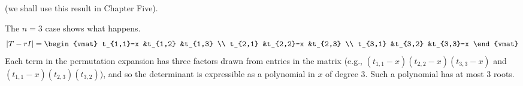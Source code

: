 \begin{exercises}
    (we shall use this result in Chapter Five).
    \begin{answer}
      The $n=3$ case shows what happens.
      \begin{equation*}
        \deter{T-rI}
        =
        \begin{vmat}
          t_{1,1}-x  &t_{1,2}   &t_{1,3}  \\ 
          t_{2,1}    &t_{2,2}-x &t_{2,3}  \\ 
          t_{3,1}    &t_{3,2}   &t_{3,3}-x  
        \end{vmat}
      \end{equation*}
      Each term in the permutation expansion has three factors drawn from 
      entries in the matrix (e.g., $(t_{1,1}-x)(t_{2,2}-x)(t_{3,3}-x)$
      and $(t_{1,1}-x)(t_{2,3})(t_{3,2})$), and so the determinant is
      expressible as a polynomial in $x$ of degree $3$.
      Such a polynomial has at most $3$ roots.


\end{answer}
\end{exercises}
